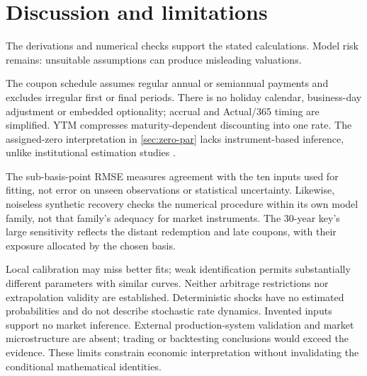 \chapter{Discussion and limitations}\label{ch:limitations}
The derivations and numerical checks support the stated calculations. Model risk remains: unsuitable assumptions can produce misleading valuations.

The coupon schedule assumes regular annual or semiannual payments and excludes irregular first or final periods. There is no holiday calendar, business-day adjustment or embedded optionality; accrual and Actual/365 timing are simplified. YTM compresses maturity-dependent discounting into one rate. The assigned-zero interpretation in \cref{sec:zero-par} lacks instrument-based inference, unlike institutional estimation studies \parencite{gurkaynak2007,anderson2001}.

The sub-basis-point RMSE measures agreement with the ten inputs used for fitting, not error on unseen observations or statistical uncertainty. Likewise, noiseless synthetic recovery checks the numerical procedure within its own model family, not that family's adequacy for market instruments. The 30-year key's large sensitivity reflects the distant redemption and late coupons, with their exposure allocated by the chosen basis.

Local calibration may miss better fits; weak identification permits substantially different parameters with similar curves. Neither arbitrage restrictions nor extrapolation validity are established. Deterministic shocks have no estimated probabilities and do not describe stochastic rate dynamics. Invented inputs support no market inference. External production-system validation and market microstructure are absent; trading or backtesting conclusions would exceed the evidence. These limits constrain economic interpretation without invalidating the conditional mathematical identities.
